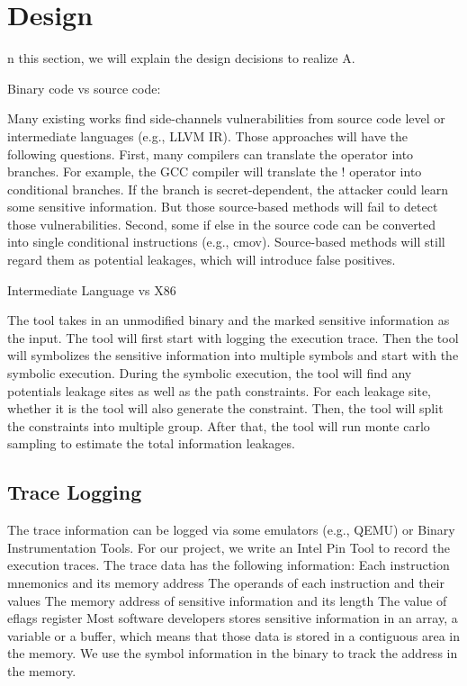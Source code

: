 \section{Design}
n this section, we will explain the design decisions to realize A. 

Binary code vs source code:

Many existing works find side-channels vulnerabilities from source code level or intermediate languages (e.g., LLVM IR). Those approaches will have the following questions. First, many compilers can translate the operator into branches. For example, the GCC compiler will translate the ! operator into conditional branches. If the branch is secret-dependent, the attacker could learn some sensitive information. But those source-based methods will fail to detect those vulnerabilities. Second, some if else in the source code can be converted into single conditional instructions (e.g., cmov). Source-based methods will still regard them as potential leakages, which will introduce false positives.

Intermediate Language vs X86 


The tool takes in an unmodified binary and the marked sensitive information as the input. The tool will first start with logging the execution trace. Then the tool will symbolizes the sensitive information into multiple symbols and start with the symbolic execution. During the symbolic execution, the tool will find any potentials leakage sites as well as the path constraints. For each leakage site, whether it is  the tool will also generate the constraint. Then, the tool will split the constraints into multiple group. After that, the tool will run monte carlo sampling to estimate the total information leakages.

\subsection{Trace Logging}
The trace information can be logged via some emulators (e.g., QEMU) or Binary Instrumentation Tools. For our project, we write an Intel Pin Tool to record the execution traces. The trace data has the following information:
Each instruction mnemonics and its memory address
The operands of each instruction and their values
The memory address of sensitive information and its length
The value of eflags register
Most software developers stores sensitive information in an array, a variable or a buffer, which means that those data is stored in a contiguous area in the memory. We use the symbol information in the binary to track the address in the memory.

